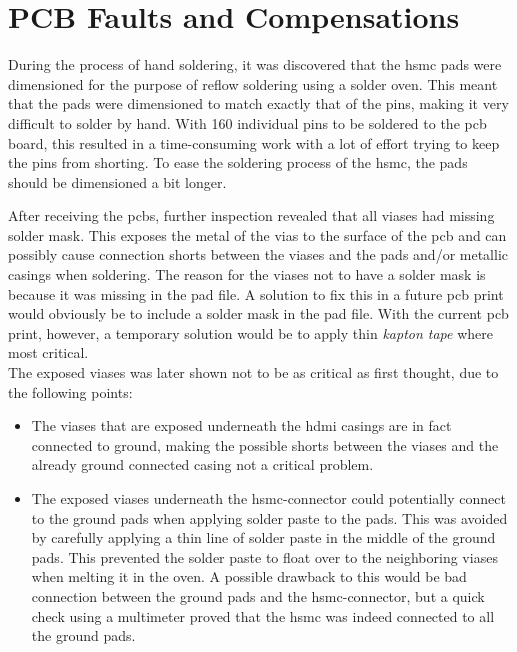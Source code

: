 \documentclass[main.tex]{subfiles}
\begin{document}
\section{PCB Faults and Compensations}

During the process of hand soldering, it was discovered that the \gls{hsmc} pads were dimensioned for the purpose of reflow soldering using a solder oven. This meant that the pads were dimensioned to match exactly that of the pins, making it very difficult to solder by hand. With 160 individual pins to be soldered to the \gls{pcb} board, this resulted in a time-consuming work with a lot of effort trying to keep the pins from shorting. To ease the soldering process of the \gls{hsmc}, the pads should be dimensioned a bit longer.

After receiving the \glspl{pcb}, further inspection revealed that all viases had missing solder mask. This exposes the metal of the vias to the surface of the \gls{pcb} and can possibly cause connection shorts between the viases and the pads and/or metallic casings when soldering. The reason for the viases not to have a solder mask is because it was missing in the pad file. A solution to fix this in a future \gls{pcb} print would obviously be to include a solder mask in the pad file.
With the current \gls{pcb} print, however, a temporary solution would be to apply thin \textit{kapton tape} where most critical.\\

The exposed viases was later shown not to be as critical as first thought, due to the following points:\\

\begin{itemize}\setlength{\itemsep}{10pt}
\item The viases that are exposed underneath the \gls{hdmi} casings are in fact connected to ground, making the possible shorts between the viases and the already ground connected casing not a critical problem.
\item The exposed viases underneath the \gls{hsmc}-connector could potentially connect to the ground pads when applying solder paste to the pads. This was avoided by carefully applying  a thin line of solder paste in the middle of the ground pads. This prevented the solder paste to float over to the neighboring viases when melting it in the oven. A possible drawback to this would be bad connection between the ground pads and the \gls{hsmc}-connector, but a quick check using a multimeter proved that the \gls{hsmc} was indeed connected to all the ground pads.\\
\end{itemize}
\end{document}
